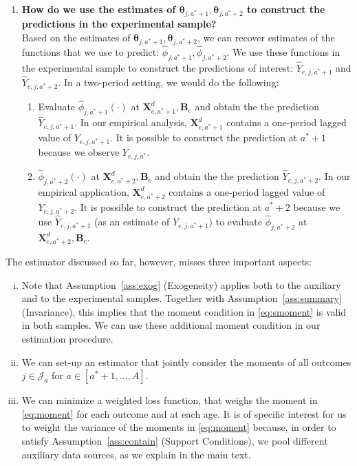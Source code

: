 \begin{enumerate}
\item \textbf{How do we use the estimates of $\bm{\theta}_{j,a^*+1}, \bm{\theta}_{j,a^*+2}$ to construct the predictions in the experimental sample?}\\ 
\noindent Based on the estimates of $\bm{\theta}_{j,a^*+1}, \bm{\theta}_{j,a^*+2}$, we can recover estimates of the functions that we use to predict: $\hat{\phi}_{j,a^*+1}, \hat{\phi}_{j,a^*+2}$. We use these functions in the experimental sample to construct the predictions of interest: $\hat{Y}_{e,j,a^*+1}$ and $\hat{Y}_{e,j,a^*+2}$. In a two-period setting, we would do the following: 

\begin{enumerate}
\item Evaluate $\hat{\phi}_{j,a^*+1} \left( \cdot \right)$ at  $\bm{X}_{e,a^*+1}^d, \bm{B}_{e}$ and obtain the the prediction $\hat{Y}_{e,j,a^*+1}$. In our empirical analysis, $\bm{X}_{e,a^*+1}^d$ contains a one-period lagged value of $Y_{e,j,a^*+1}$. It is possible to construct the prediction at $a^*+1$ because we observe $Y_{e,j,a^*}$.

\item $\hat{\phi}_{j,a^*+2} \left( \cdot \right)$ at  $\bm{X}_{e,a^*+2}^d, \bm{B}_{e}$ and obtain the the prediction $\hat{Y}_{e,j,a^*+2}$. In our empirical application, $\bm{X}_{e,a^*+2}^d$ contains a one-period lagged value of $Y_{e,j,a^*+2}$. It is possible to construct the prediction at $a^*+2$ because we use $\hat{Y}_{e,j,a^*+1}$ (as an estimate of $Y_{e,j,a^*+1}$) to evaluate $\hat{\phi}_{j,a^*+2}$ at  $\bm{X}_{e,a^*+2}^d, \bm{B}_{e}$.
\end{enumerate}
\end{enumerate}

\noindent \noindent The estimator discussed so far, however, misses three important aspects: 

\begin{enumerate}[(i)] 
\item Note that Assumption~\ref{ass:exog} (Exogeneity) applies both to the auxiliary and to the experimental samples. Together with Assumption~\ref{ass:summary} (Invariance), this implies that the moment condition in \eqref{eq:smoment} is valid in both samples. We can use these additional moment condition in our estimation procedure.
\item We can set-up an estimator that jointly consider the moments of all outcomes $j \in \mathcal{J}_{a}$ for $a \in [a^*+1, \ldots, A]$.
\item We can minimize a weighted loss function, that weighs the moment in \eqref{eq:moment} for each outcome and at each age. It is of specific interest for us to weight the variance of the moments in \eqref{eq:moment} because, in order to satisfy Assumption~\ref{ass:contain} (Support Conditions), we pool different auxiliary data sources, as we explain in the main text.
\end{enumerate}

